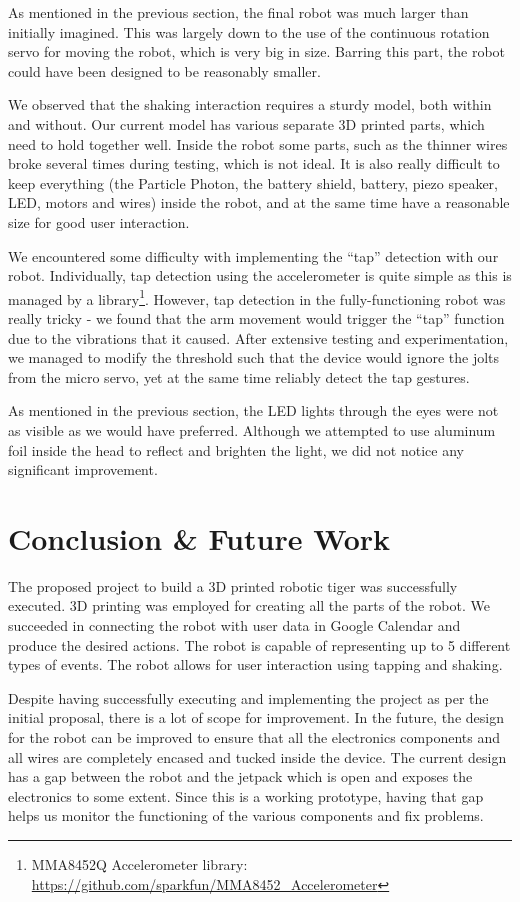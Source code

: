 \documentclass{sigchi-ext}
\begin{document}
As mentioned in the previous section, the final robot was much larger than
initially imagined. This was largely down to the use of the continuous rotation
servo for moving the robot, which is very big in size. Barring this part, the
robot could have been designed to be reasonably smaller.

We observed that the shaking interaction requires a sturdy model, both within
and without. Our current model has various separate 3D printed parts, which
need to hold together well. Inside the robot some parts, such as the thinner
wires broke several times during testing, which is not ideal. It is also really
difficult to keep everything (the Particle Photon, the battery shield, battery,
piezo speaker, LED, motors and wires) inside the robot, and at the same time
have a reasonable size for good user interaction.

We encountered some difficulty with implementing the ``tap'' detection with our
robot. Individually, tap detection using the accelerometer is quite simple as
this is managed by a library\footnote{MMA8452Q Accelerometer library:
  \url{https://github.com/sparkfun/MMA8452\_Accelerometer}}. However, tap detection in
the fully-functioning robot was really tricky - we found that the arm movement
would trigger the ``tap'' function due to the vibrations that it caused. After
extensive testing and experimentation, we managed to modify the threshold such
that the device would ignore the jolts from the micro servo, yet at the same
time reliably detect the tap gestures.

As mentioned in the previous section, the LED lights through the eyes were not
as visible as we would have preferred. Although we attempted to use aluminum
foil inside the head to reflect and brighten the light, we did not notice any
significant improvement.

\section{Conclusion \& Future Work}

The proposed project to build a 3D printed robotic tiger was successfully
executed. 3D printing was employed for creating all the parts of the robot. We
succeeded in connecting the robot with user data in Google Calendar and produce
the desired actions. The robot is capable of representing up to 5 different
types of events. The robot allows for user interaction using tapping and
shaking.

Despite having successfully executing and implementing the project as per the
initial proposal, there is a lot of scope for improvement. In the future, the
design for the robot can be improved to ensure that all the electronics
components and all wires are completely encased and tucked inside the device.
The current design has a gap between the robot and the jetpack which is open
and exposes the electronics to some extent. Since this is a working prototype,
having that gap helps us monitor the functioning of the various components and
fix problems.
\end{document}
